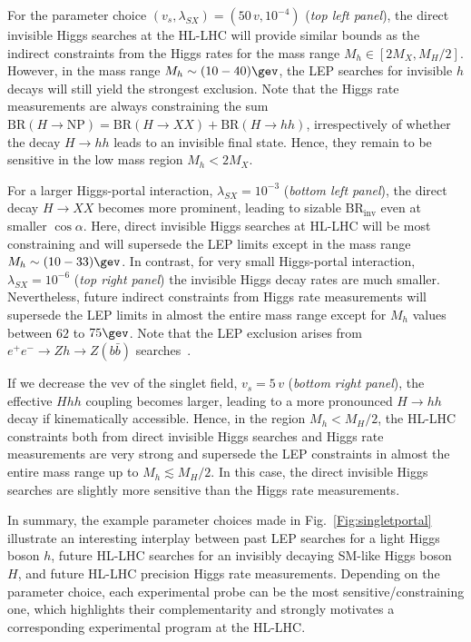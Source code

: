\documentclass[../report.tex]{subfiles}
\newcommand{\BRHinv}{\mathrm{BR}_\mathrm{inv}}
\newcommand{\BRNP}{\mathrm{BR}(H\to\mathrm{NP})}
\begin{document}
For the parameter choice $(v_s, \lambda_{SX}) = (50\,v, 10^{-4})$ (\emph{top left panel}), the direct invisible Higgs searches at the HL-LHC {will} provide similar bounds as the indirect constraints from the Higgs rates for the mass range $M_h \in [2 M_X, M_H/2]$. However, in the mass range $M_{h}\sim (10-40)\gev$, the LEP searches for invisible $h$ decays will still yield the strongest exclusion. Note that the Higgs rate measurements are always constraining the sum $\BRNP = \mathrm{BR}(H\to XX) + \mathrm{BR}(H\to hh)$, irrespectively of whether the decay $H\to hh$ leads to an invisible final state. Hence, they remain to be sensitive in the low mass region $M_h < 2 M_X$.

For a larger Higgs-portal interaction, $\lambda_{SX} = 10^{-3}$ (\emph{bottom left panel}), the direct decay $H\to XX$ becomes more prominent, leading to sizable $\BRHinv$ even at smaller $\cos\alpha$. Here, direct invisible Higgs searches at HL-LHC will be most constraining and will supersede the LEP limits except in the mass range $M_h\sim (10-33)\gev$. {In contrast,} for very small Higgs-portal interaction, $\lambda_{SX} = 10^{-6}$ (\emph{top right panel}) {the invisible Higgs decay rates are much smaller. Nevertheless,} future indirect constraints from Higgs rate measurements will supersede the LEP limits {in almost the entire mass range except for $M_h$ values between $62$ to $75\gev$.}
Note that the LEP exclusion arises from $e^+e^- \to Zh \to Z(b\bar{b})$ searches~\cite{Schael:2006cr}.

If we decrease the vev of the singlet field, $v_s = 5\,v$ (\emph{bottom right panel}), the effective $Hhh$ coupling becomes larger, leading to a more pronounced $H\to hh$ decay if kinematically accessible. Hence, in the region $M_{h} < M_H/2$, the HL-LHC constraints both from direct invisible Higgs searches and Higgs rate measurements are very strong and supersede the LEP constraints in almost the entire mass range up to $M_h \lesssim M_H/2$. {In this case, the direct invisible Higgs searches} are slightly more {sensitive} than the {Higgs rate measurements}.

In summary, the example parameter choices made in Fig.~\ref{Fig:singletportal} illustrate an interesting interplay between past LEP searches for a light Higgs boson $h$, future HL-LHC searches for an invisibly decaying SM-like Higgs boson $H$, and future HL-LHC precision Higgs rate measurements. Depending on the parameter choice, each experimental probe can be the most sensitive/constraining one, which highlights their complementarity and strongly motivates a corresponding experimental program at the HL-LHC. 
\end{document}
